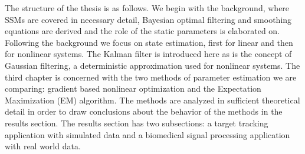 
The structure of the thesis is as follows. We begin with the background, where
SSMs are covered in necessary detail, Bayesian optimal filtering
and smoothing equations are derived and the role of the static parameters is elaborated
on. Following the background we focus on state estimation, first for linear
and then for nonlinear systems. The Kalman filter is introduced here as is the
concept of Gaussian filtering, a deterministic approximation used for nonlinear systems.
The third chapter is concerned with the two methods
of parameter estimation we are comparing: gradient based nonlinear optimization
and the Expectation Maximization (EM) algorithm. The methods are analyzed in sufficient
theoretical detail in order to draw conclusions about the behavior of the methods
in the results section. The results section has two subsections: 
a target tracking application with simulated data and a biomedical signal processing 
application with real world data.



